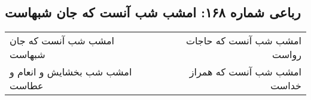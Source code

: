 \begin{center}
\section*{رباعی شماره ۱۶۸: امشب شب آنست که جان شبهاست}
\label{sec:0168}
\begin{longtable}{l p{0.5cm} r}
امشب شب آنست که جان شبهاست
&&
امشب شب آنست که حاجات رواست
\\
امشب شب بخشایش و انعام و عطاست
&&
امشب شب آنست که همراز خداست
\\
\end{longtable}
\end{center}
